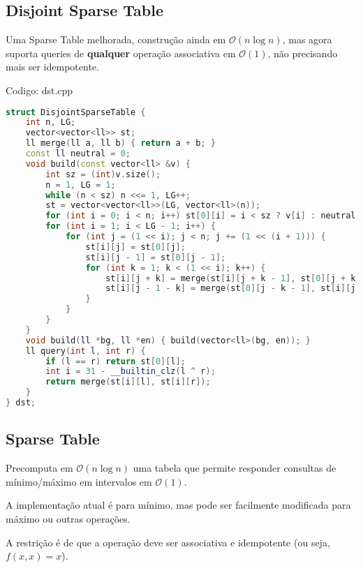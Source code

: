 \documentclass[10pt, a4paper, oneside]{book}
\begin{document}
\subsection{Disjoint Sparse Table}


Uma Sparse Table melhorada, construção ainda em $\mathcal{O}(n \log n)$, mas agora suporta queries de \textbf{qualquer} operação associativa em $\mathcal{O}(1)$, não precisando mais ser idempotente.

\hfill

Codigo: dst.cpp

\begin{lstlisting}[language=C++]
struct DisjointSparseTable {
    int n, LG;
    vector<vector<ll>> st;
    ll merge(ll a, ll b) { return a + b; }
    const ll neutral = 0;
    void build(const vector<ll> &v) {
        int sz = (int)v.size();
        n = 1, LG = 1;
        while (n < sz) n <<= 1, LG++;
        st = vector<vector<ll>>(LG, vector<ll>(n));
        for (int i = 0; i < n; i++) st[0][i] = i < sz ? v[i] : neutral;
        for (int i = 1; i < LG - 1; i++) {
            for (int j = (1 << i); j < n; j += (1 << (i + 1))) {
                st[i][j] = st[0][j];
                st[i][j - 1] = st[0][j - 1];
                for (int k = 1; k < (1 << i); k++) {
                    st[i][j + k] = merge(st[i][j + k - 1], st[0][j + k]);
                    st[i][j - 1 - k] = merge(st[0][j - k - 1], st[i][j - k]);
                }
            }
        }
    }
    void build(ll *bg, ll *en) { build(vector<ll>(bg, en)); }
    ll query(int l, int r) {
        if (l == r) return st[0][l];
        int i = 31 - __builtin_clz(l ^ r);
        return merge(st[i][l], st[i][r]);
    }
} dst;\end{lstlisting}
\hfill

\subsection{Sparse Table}


Precomputa em $\mathcal{O}(n \log n)$ uma tabela que permite responder consultas de mínimo/máximo em intervalos em $\mathcal{O}(1)$.



A implementação atual é para mínimo, mas pode ser facilmente modificada para máximo ou outras operações.



A restrição é de que a operação deve ser associativa e idempotente (ou seja, $f(x, x) = x$).
\end{document}
